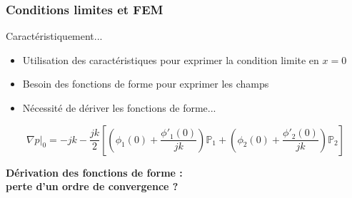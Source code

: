 \documentclass[10pt, compress]{beamer}
\newcommand\GP{\mathbb{P}}
\begin{document}
\begin{frame}
	\frametitle{Conditions limites et FEM}

	\begin{block}{Caractéristiquement...}
		\begin{itemize}
			\item Utilisation des caractéristiques pour exprimer la condition limite en $x=0$
			\item Besoin des fonctions de forme pour exprimer les champs
			\item Nécessité de dériver les fonctions de forme...
		\end{itemize}

		\pause

		\begin{equation*}
			\nabla p\bigg|_0 = - jk -\frac{jk}{2}\left[\left(\phi_1(0) + \frac{\phi'_1(0)}{jk}\right)\GP_1 + \left(\phi_2(0) + \frac{\phi'_2(0)}{jk}\right)\GP_2 \right]
		\end{equation*}
	\end{block}

	\begin{center}
		\alert{\textbf{Dérivation des fonctions de forme : \\perte d'un ordre de convergence ?}}
	\end{center}
\end{frame}
\end{document}
